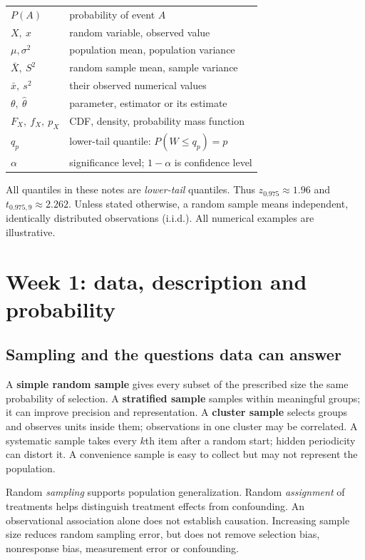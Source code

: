 \begin{center}
\begin{tabular}{ll}
$P(A)$ & probability of event $A$\\
$X,\ x$ & random variable, observed value\\
$\mu,\sigma^2$ & population mean, population variance\\
$\bar X,\ S^2$ & random sample mean, sample variance\\
$\bar x,\ s^2$ & their observed numerical values\\
$\theta,\ \hat\theta$ & parameter, estimator or its estimate\\
$F_X,\ f_X,\ p_X$ & CDF, density, probability mass function\\
$q_p$ & lower-tail quantile: $P(W\leq q_p)=p$\\
$\alpha$ & significance level; $1-\alpha$ is confidence level
\end{tabular}
\end{center}
All quantiles in these notes are \emph{lower-tail} quantiles. Thus
$z_{0.975}\approx1.96$ and $t_{0.975,9}\approx2.262$.
Unless stated otherwise, a random sample means independent, identically
distributed observations (i.i.d.). All numerical examples are illustrative.

\clearpage
\section{Week 1: data, description and probability}
\subsection{Sampling and the questions data can answer}
A \textbf{simple random sample} gives every subset of the prescribed size
the same probability of selection. A \textbf{stratified sample} samples
within meaningful groups; it can improve precision and representation.
A \textbf{cluster sample} selects groups and observes units inside them;
observations in one cluster may be correlated. A systematic sample takes
every $k$th item after a random start; hidden periodicity can distort it.
A convenience sample is easy to collect but may not represent the population.

Random \emph{sampling} supports population generalization. Random
\emph{assignment} of treatments helps distinguish treatment effects from
confounding. An observational association alone does not establish causation.
Increasing sample size reduces random sampling error, but does not remove
selection bias, nonresponse bias, measurement error or confounding.

